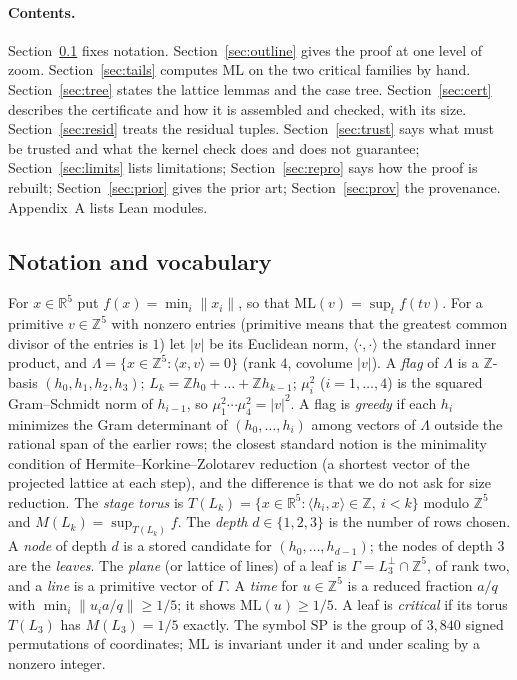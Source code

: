 \documentclass[11pt]{article}
\theoremstyle{remark}
\newcommand{\ML}{\mathrm{ML}}
\newcommand{\R}{\mathbb{R}}
\newcommand{\Z}{\mathbb{Z}}
\newcommand{\dist}[1]{\lVert #1\rVert}
\begin{document}
\paragraph{Contents.} Section~\ref{sec:notation} fixes notation. Section~\ref{sec:outline} gives the proof at one level of zoom. Section~\ref{sec:tails} computes $\ML$ on the two critical families by hand. Section~\ref{sec:tree} states the lattice lemmas and the case tree. Section~\ref{sec:cert} describes the certificate and how it is assembled and checked, with its size. Section~\ref{sec:resid} treats the residual tuples. Section~\ref{sec:trust} says what must be trusted and what the kernel check does and does not guarantee; Section~\ref{sec:limits} lists limitations; Section~\ref{sec:repro} says how the proof is rebuilt; Section~\ref{sec:prior} gives the prior art; Section~\ref{sec:prov} the provenance. Appendix~A lists Lean modules.

\subsection{Notation and vocabulary}\label{sec:notation}

For $x\in\R^5$ put $f(x)=\min_i\dist{x_i}$, so that $\ML(v)=\sup_tf(tv)$. For a primitive $v\in\Z^5$ with nonzero entries (primitive means that the greatest common divisor of the entries is $1$) let $|v|$ be its Euclidean norm, $\langle\cdot,\cdot\rangle$ the standard inner product, and $\Lambda=\{x\in\Z^5:\langle x,v\rangle=0\}$ (rank $4$, covolume $|v|$). A \emph{flag} of $\Lambda$ is a $\Z$-basis $(h_0,h_1,h_2,h_3)$; $L_k=\Z h_0+\dots+\Z h_{k-1}$; $\mu_i^2$ ($i=1,\dots,4$) is the squared Gram--Schmidt norm of $h_{i-1}$, so $\mu_1^2\cdots\mu_4^2=|v|^2$. A flag is \emph{greedy} if each $h_i$ minimizes the Gram determinant of $(h_0,\dots,h_i)$ among vectors of $\Lambda$ outside the rational span of the earlier rows; the closest standard notion is the minimality condition of Hermite--Korkine--Zolotarev reduction (a shortest vector of the projected lattice at each step), and the difference is that we do not ask for size reduction. The \emph{stage torus} is $T(L_k)=\{x\in\R^5:\langle h_i,x\rangle\in\Z,\ i<k\}$ modulo $\Z^5$ and $M(L_k)=\sup_{T(L_k)}f$. The \emph{depth} $d\in\{1,2,3\}$ is the number of rows chosen. A \emph{node} of depth $d$ is a stored candidate for $(h_0,\dots,h_{d-1})$; the nodes of depth $3$ are the \emph{leaves}. The \emph{plane} (or lattice of lines) of a leaf is $\Gamma=L_3^\perp\cap\Z^5$, of rank two, and a \emph{line} is a primitive vector of $\Gamma$. A \emph{time} for $u\in\Z^5$ is a reduced fraction $a/q$ with $\min_i\dist{u_ia/q}\ge1/5$; it shows $\ML(u)\ge1/5$. A leaf is \emph{critical} if its torus $T(L_3)$ has $M(L_3)=1/5$ exactly. The symbol $\mathrm{SP}$ is the group of $3{,}840$ signed permutations of coordinates; $\ML$ is invariant under it and under scaling by a nonzero integer.
\end{document}
